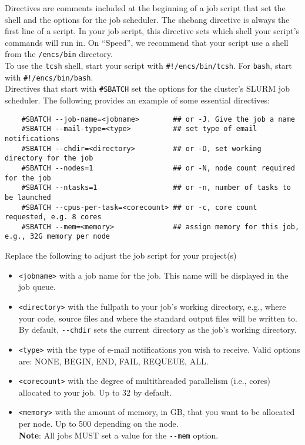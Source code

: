
Directives are comments included at the beginning of a job script that set the shell 
and the options for the job scheduler.
%
The shebang directive is always the first line of a script. In your job script, 
this directive sets which shell your script's commands will run in. On ``Speed'', 
we recommend that your script use a shell from the \texttt{/encs/bin} directory.\\

To use the \texttt{tcsh} shell, start your script with \verb|#!/encs/bin/tcsh|.
For \texttt{bash}, start with \verb|#!/encs/bin/bash|.\\

Directives that start with \verb|#SBATCH| set the options for the cluster's 
SLURM job scheduler. The following provides an example of some essential directives:


\begin{verbatim}
    #SBATCH --job-name=<jobname>        ## or -J. Give the job a name 
    #SBATCH --mail-type=<type>          ## set type of email notifications
    #SBATCH --chdir=<directory>         ## or -D, set working directory for the job
    #SBATCH --nodes=1                   ## or -N, node count required for the job
    #SBATCH --ntasks=1                  ## or -n, number of tasks to be launched
    #SBATCH --cpus-per-task=<corecount> ## or -c, core count requested, e.g. 8 cores
    #SBATCH --mem=<memory>              ## assign memory for this job, e.g., 32G memory per node 
\end{verbatim}

\noindent Replace the following to adjust the job script for your project(s)
\begin{itemize}
    \item \verb+<jobname>+ with a job name for the job. This name will be displayed in the job queue.
    \item \verb+<directory>+ with the fullpath to your job's working directory, e.g., where your code, 
    source files and where the standard output files will be written to. 
    By default, \verb+--chdir+ sets the current directory as the job's working directory.
    \item \verb+<type>+ with the type of e-mail notifications you wish to receive. 
    Valid options are: NONE, BEGIN, END, FAIL, REQUEUE, ALL.
    \item \verb+<corecount>+ with the degree of multithreaded parallelism (i.e., cores) allocated to your job. Up to 32 by default.
    \item \verb+<memory>+ with the amount of memory, in GB, that you want to be allocated per node. Up to 500 depending on the node.\\
    \textbf{Note}: All jobs MUST set a value for the \verb|--mem| option.
\end{itemize}

